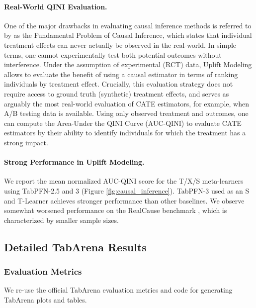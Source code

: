\paragraph{Real-World QINI Evaluation.} One of the major drawbacks in evaluating causal inference methods is referred to by \citet{holland1986statistics} as the Fundamental Problem of Causal Inference, which states that individual treatment effects can never actually be observed in the real-world. In simple terms, one cannot experimentally test both potential outcomes without interference. Under the assumption of experimental (RCT) data, Uplift Modeling \cite{user-guide-for-uplift-modeling} allows to evaluate the benefit of using a causal estimator in terms of ranking individuals by treatment effect. Crucially, this evaluation strategy does not require access to ground truth (synthetic) treatment effects, and serves as arguably the most real-world evaluation of CATE estimators, for example, when A/B testing data is available. Using only observed treatment and outcomes, one can compute the Area-Under the QINI Curve (AUC-QINI) to evaluate CATE estimators by their ability to identify individuals for which the treatment has a strong impact. 

\paragraph{Strong Performance in Uplift Modeling.} We report the mean normalized AUC-QINI score for the T/X/S meta-learners using TabPFN-2.5 and 3 (Figure \ref{fig:causal_inference}). TabPFN-3 used as an S and T-Learner achieves stronger performance than other baselines. We observe somewhat worsened performance on the RealCause benchmark \cite{neal_realcause}, which is characterized by smaller sample sizes.



\subsection{Detailed TabArena Results}
\label{app:tabarena-detailed}

\subsubsection{Evaluation Metrics}
\label{app:tabarena-metrics}

We re-use the official TabArena \citep{erickson2025tabarena} evaluation metrics and code for generating TabArena plots and tables.

